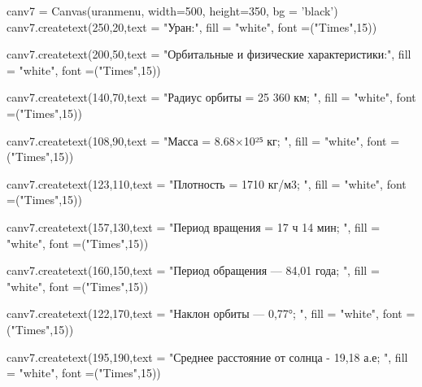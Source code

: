 \documentclass[14pt, oneside]{SavkinSeliverstov}
\begin{document}
	canv\underline{\hspace{0.2cm}}7 = Canvas(uran\underline{\hspace{0.2cm}}menu, width=500, height=350, bg = 'black')
	canv\underline{\hspace{0.2cm}}7.create\underline{\hspace{0.2cm}}text(250,20,text = "Уран:", fill = "white", font =("Times",15))

	canv\underline{\hspace{0.2cm}}7.create\underline{\hspace{0.2cm}}text(200,50,text = "Орбитальные и физические характеристики:", fill = "white", font =("Times",15))

	canv\underline{\hspace{0.2cm}}7.create\underline{\hspace{0.2cm}}text(140,70,text = "Радиус орбиты =  25 360 км; ", fill = "white", font =("Times",15))
	
	canv\underline{\hspace{0.2cm}}7.create\underline{\hspace{0.2cm}}text(108,90,text = "Масса = 8.68×10²⁵ кг; ", fill = "white", font =("Times",15))

	canv\underline{\hspace{0.2cm}}7.create\underline{\hspace{0.2cm}}text(123,110,text = "Плотность = 1710 кг/м3; ", fill = "white", font =("Times",15))

	canv\underline{\hspace{0.2cm}}7.create\underline{\hspace{0.2cm}}text(157,130,text = "Период вращения = 17 ч 14 мин; ", fill = "white", font =("Times",15))

	canv\underline{\hspace{0.2cm}}7.create\underline{\hspace{0.2cm}}text(160,150,text = "Период обращения — 84,01 года; ", fill = "white", font =("Times",15))

	canv\underline{\hspace{0.2cm}}7.create\underline{\hspace{0.2cm}}text(122,170,text = "Наклон орбиты — 0,77°; ", fill = "white", font =("Times",15))

	canv\underline{\hspace{0.2cm}}7.create\underline{\hspace{0.2cm}}text(195,190,text = "Среднее расстояние от солнца - 19,18 а.е; ", fill = "white", font =("Times",15))
	
\end{document}
